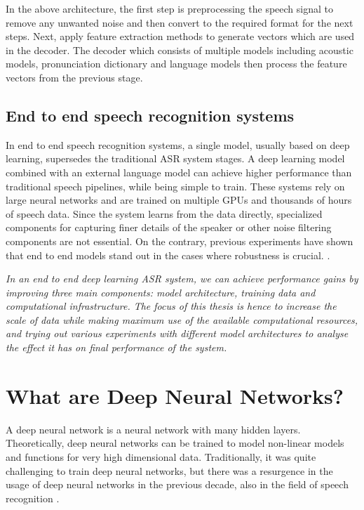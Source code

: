 In the above architecture, the first step is preprocessing the speech signal to remove any unwanted noise and then convert to the required format for the next steps. Next, apply feature extraction methods to generate vectors which are used in the decoder. The decoder which consists of multiple models including acoustic models, pronunciation dictionary and language models then process the feature vectors from the previous stage.

\subsection{End to end speech recognition systems}
\label{section:e2easr}
In end to end speech recognition systems, a single model, usually based on deep learning, supersedes the traditional ASR system stages. A deep learning model combined with an external language model can achieve higher performance than traditional speech pipelines, while being simple to train. These systems rely on large neural networks and are trained on multiple GPUs and thousands of hours of speech data. Since the system learns from the data directly, specialized components for capturing finer details of the speaker or other noise filtering components are not essential. On the contrary, previous experiments have shown that end to end models stand out in the cases where robustness is crucial. \cite{Hannun2014DeepRecognition}. 

\emph{In an end to end deep learning ASR system, we can achieve performance gains by improving three main components: model architecture, training data and computational infrastructure. The focus of this thesis is hence to increase the scale of data while making maximum use of the available computational resources, and trying out various experiments with different model architectures to analyse the effect it has on final performance of the system.}

\section{What are Deep Neural Networks?}
A deep neural network is a neural network with many hidden layers. Theoretically, deep neural networks can be trained to model non-linear models and functions for very high dimensional data. Traditionally, it was quite challenging to train deep neural networks, but there was a resurgence in the usage of deep neural networks in the previous decade, also in the field of speech recognition \cite{Dahl2012Context-DependentRecognition, Morgan2012DeepRecognition, DengRECENTMICROSOFT, Hannun2014DeepRecognition}. 

